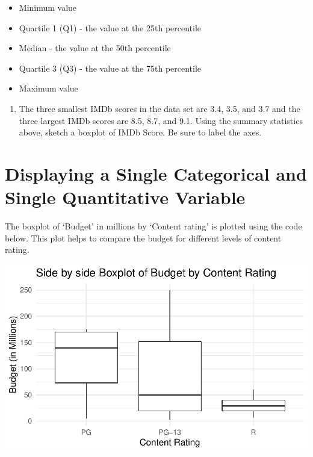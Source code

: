 \documentclass[
]{report}
\providecommand{\tightlist}{%
  \setlength{\itemsep}{0pt}\setlength{\parskip}{0pt}}
\begin{document}
\begin{itemize}
\item
  Minimum value
\item
  Quartile 1 (Q1) - the value at the 25th percentile
\item
  Median - the value at the 50th percentile
\item
  Quartile 3 (Q3) - the value at the 75th percentile
\item
  Maximum value
\end{itemize}

\begin{enumerate}
\def\labelenumi{\arabic{enumi}.}
\setcounter{enumi}{9}
\tightlist
\item
  The three smallest IMDb scores in the data set are 3.4, 3.5, and 3.7 and the three largest IMDb scores are 8.5, 8.7, and 9.1. Using the summary statistics above, sketch a boxplot of IMDb Score. Be sure to label the axes.
\end{enumerate}

\vspace{2in}

\hypertarget{displaying-a-single-categorical-and-single-quantitative-variable}{%
\section{Displaying a Single Categorical and Single Quantitative Variable}\label{displaying-a-single-categorical-and-single-quantitative-variable}}

The boxplot of `Budget' in millions by `Content rating' is plotted using the code below. This plot helps to compare the budget for different levels of content rating.

\begin{center}\includegraphics[width=0.7\linewidth]{04-EDA-quantitative_files/figure-latex/unnamed-chunk-4-1} \end{center}
\end{document}
